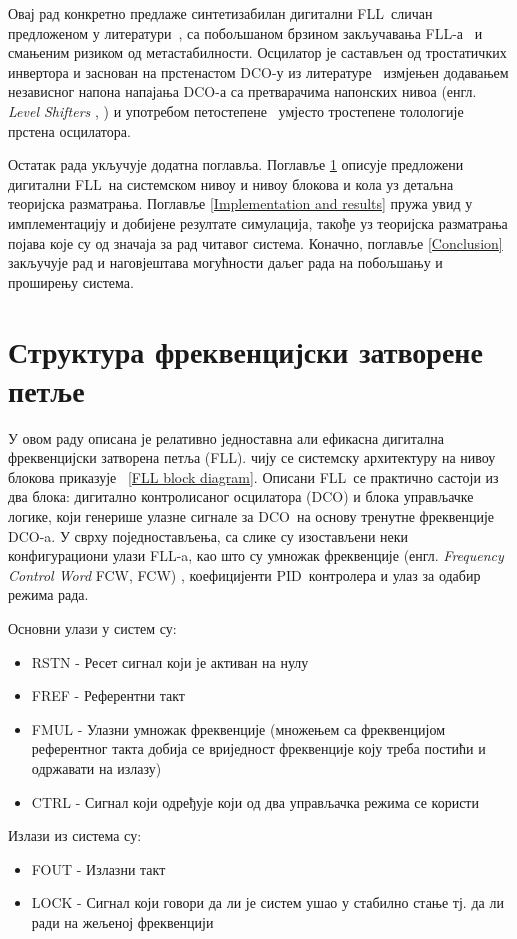 \documentclass[master]{finthesis}
\makeatletter
\newcommand*{\engl}[2][\@empty]{%
    \edef\theacronym{#1}%
    (енгл. \foreignlanguage{english}{\emph{#2}%
    \ifx\theacronym\@empty \else , #1\fi})%
}
\def \FLL  {FLL} %
\def \DCO  {DCO} %
\def \PID  {PID} %
\makeatother
\begin{document}
Овај рад конкретно предлаже синтетизабилан дигитални \FLL\ сличан предложеном у литератури~\cite{Musa:6644316}, са побољшаном брзином закључавања \FLL-а~\cite{Deng:6891375} и смањеним ризиком од метастабилности. Осцилатор је састављен од тростатичких инвертора и заснован на прстенастом \DCO-у из литературе~\cite{Tierno:4443210} измјењен додавањем независног напона напајања \DCO-а са претварачима напонских нивоа \engl{Level Shifters} и употребом петостепене~\cite{Rylyakov:4523284} умјесто тростепене толологије прстена осцилатора.

Остатак рада укључује додатна поглавља. Поглавље \ref{FLL structure} описује предложени дигитални \FLL\ на системском нивоу и нивоу блокова и кола уз детаљна теоријска разматрања. Поглавље \ref{Implementation and results} пружа увид у имплементацију и добијене резултате симулација, такође уз теоријска разматрања појава које су од значаја за рад читавог система. Коначно, поглавље \ref{Conclusion} закључује рад и наговјештава могућности даљег рада на побољшању и проширењу система.


\section{Структура фреквенцијски затворене петље} \label{FLL structure}


У овом раду описана је релативно једноставна али ефикасна дигитална фреквенцијски затворена петља (\FLL). чију се системску архитектуру на нивоу блокова приказује \figurename~\ref{FLL block diagram}. Описани \FLL\ се практично састоји из два блока: дигитално контролисаног осцилатора (\DCO) и блока управљачке логике, који генерише улазне сигнале за \DCO\ на основу тренутне фреквенције \DCO-a. У сврху поједностављења, са слике су изостављени неки конфигурациони улази \FLL-a, као што су умножак фреквенције \engl[FCW]{Frequency Control Word}, коефицијенти \PID\ контролера и улаз за одабир режима рада. 



Основни улази у систем су:
\begin{itemize}
	\item RSTN - Ресет сигнал који је активан на нулу
	\item FREF - Референтни такт
	\item FMUL - Улазни умножак фреквенције (множењем са фреквенцијом референтног такта добија се вриједност фреквенције коју треба постићи и одржавати на излазу)
	\item CTRL - Сигнал који одређује који од два управљачка режима се користи
\end{itemize}
Излази из система су:
\begin{itemize}
	\item FOUT - Излазни такт
	\item LOCK - Сигнал који говори да ли је систем ушао у стабилно стање тј. да ли ради на жељеној фреквенцији
\end{itemize}
\end{document}
